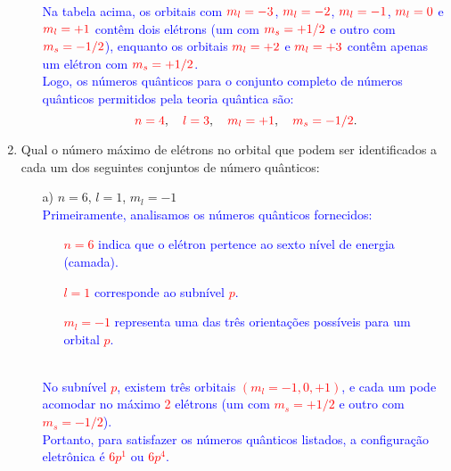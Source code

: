 \documentclass[a4paper, 12pt]{article}
\begin{document}
\begin{enumerate}
\begin{enumerate}
		            \textcolor{blue}{Na tabela acima, os orbitais com \( \textcolor{red}{m_l = -3} \), \( \textcolor{red}{m_l = -2} \), \( \textcolor{red}{m_l = -1} \), \( \textcolor{red}{m_l = 0} \) e \( \textcolor{red}{m_l = +1} \) contêm dois elétrons (um com \( \textcolor{red}{m_s = +1/2} \) e outro com \( \textcolor{red}{m_s = -1/2} \)), enquanto os orbitais \( \textcolor{red}{m_l = +2} \) e \( \textcolor{red}{m_l = +3} \) contêm apenas um elétron com \( \textcolor{red}{m_s = +1/2} \).}\\[2mm]
		            
		            
		            \textcolor{blue}{Logo, os números quânticos para o conjunto completo de números quânticos permitidos pela teoria quântica são:}
		            \[
			            \textcolor{red}{n = 4}, \quad 
			            \textcolor{red}{l = 3}, \quad 
			            \textcolor{red}{m_l = +1}, \quad 
			            \textcolor{red}{m_s = -1/2}.
		            \]
	      \end{enumerate}
	      \pagebreak
	\item Qual o número máximo de elétrons no orbital que podem ser identificados a cada um dos seguintes conjuntos de número quânticos:
	      \begin{enumerate}
		      \item[a)] \(n = 6\), \(l = 1\), \(m_l = -1\)
		            \\[10pt]
		            \textcolor{blue}{Primeiramente, analisamos os números quânticos fornecidos:}
		            \textcolor{blue}{
			            \begin{itemize}
				            \item[] \textcolor{red}{\(n = 6\)} indica que o elétron pertence ao sexto nível de energia (camada).
				            \item[] \textcolor{red}{\(l = 1\)} corresponde ao subnível \textcolor{red}{\(p\)}.
				            \item[] \textcolor{red}{\(m_l = -1\)} representa uma das três orientações possíveis para um orbital \textcolor{red}{\(p\)}.
			            \end{itemize}}
		            \textcolor{blue}{\\ No subnível \textcolor{red}{\(p\)}, existem três orbitais \textcolor{red}{\((m_l = -1, 0, +1)\)}, e cada um pode acomodar no máximo \textcolor{red}{2} elétrons (um com \textcolor{red}{\(m_s = +1/2\)} e outro com \textcolor{red}{\(m_s = -1/2\)}).}
		            \\[10pt]
		            \textcolor{blue}{Portanto, para satisfazer os números quânticos listados, a configuração eletrônica é \textcolor{red}{\(6p^1\)} ou \textcolor{red}{\(6p^4\)}.}
		            \\
		            
		            

\end{enumerate}
\end{enumerate}
\end{document}
